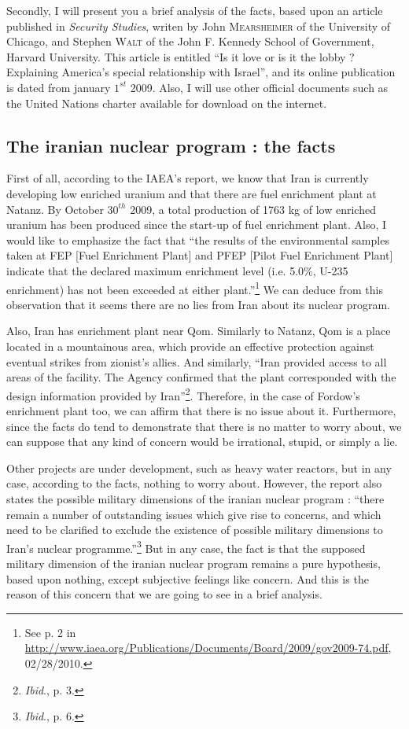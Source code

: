\documentclass[
paper=a4,
fontsize=10pt,
headsepline,
headings=normal,
version=last,
footinclude=true,
mpinclude=true,
fleqn
]{scrartcl}
\begin{document}
Secondly, I will present you a brief analysis of the facts, based upon an article published in \emph{Security Studies}, writen by John \textsc{Mearsheimer} of the University of Chicago, and Stephen \textsc{Walt} of the John F. Kennedy School of Government, Harvard University. This article is entitled \textquotedblleft Is it love or is it the lobby ? Explaining America's special relationship with Israel\textquotedblright, and its online publication is dated from january $1^{st}$ 2009. Also, I will use other official documents such as the United Nations charter available for download on the internet.

\textcolor{spot}{\section{The iranian nuclear program : the facts}}

First of all, according to the IAEA's report, we know that Iran is currently developing low enriched uranium and that there are fuel enrichment plant at Natanz. By October $30^{th}$ 2009, a total production of 1763 kg of low enriched uranium has been produced since the start-up of fuel enrichment plant. Also, I would like to emphasize the fact that \textquotedblleft the results of the environmental samples taken at FEP [Fuel Enrichment Plant] and PFEP [Pilot Fuel Enrichment Plant] indicate that the declared maximum enrichment level (i.e. 5.0\%, U-235 enrichment) has not been exceeded at either plant.\textquotedblright\footnote{See p. 2 in \url{http://www.iaea.org/Publications/Documents/Board/2009/gov2009-74.pdf}, 02/28/2010.} We can deduce from this observation that it seems there are no lies from Iran about its nuclear program.

Also, Iran has enrichment plant near Qom. Similarly to Natanz, Qom is a place located in a mountainous area, which provide an effective protection against eventual strikes from zionist's allies. And similarly, \textquotedblleft Iran provided access to all areas of the facility. The Agency confirmed that the plant corresponded with the design information provided by Iran\textquotedblright\footnote{\emph{Ibid}., p. 3.}. Therefore, in the case of Fordow's enrichment plant too, we can affirm that there is no issue about it. Furthermore, since the facts do tend to demonstrate that there is no matter to worry about, we can suppose that any kind of concern would be irrational, stupid, or simply a lie.

Other projects are under development, such as heavy water reactors, but in any case, according to the facts, nothing to worry about. However, the report also states the possible military dimensions of the iranian nuclear program : \textquotedblleft there remain a number of outstanding issues which give rise to concerns, and which need to be clarified to exclude the existence of possible military dimensions to Iran's nuclear programme.\textquotedblright\footnote{\emph{Ibid}., p. 6.} But in any case, the fact is that the supposed military dimension of the iranian nuclear program remains a pure hypothesis, based upon nothing, except subjective feelings like concern. And this is the reason of this concern that we are going to see in a brief analysis.
\end{document}

